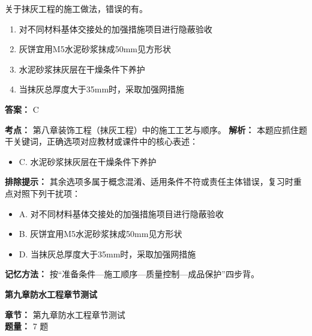\documentclass[UTF8,fontset=fandol,11pt]{ctexart}
\newcommand{\chaptertitle}[1]{\vspace{0.5em}\begin{tcolorbox}[enhanced,colback=deepblue,colframe=deepblue,arc=2mm,boxrule=0pt]\begin{center}\Large\bfseries\color{white}#1\end{center}\end{tcolorbox}\vspace{0.5em}}
\begin{document}
\begin{quizbox}[title={第 2 题}]
关于抹灰工程的施工做法，错误的有。\\
\begin{enumerate}[label=\Alph*.]
\item 对不同材料基体交接处的加强措施项目进行隐蔽验收
\item 灰饼宜用M5水泥砂浆抹成50mm见方形状
\item 水泥砂浆抹灰层在干燥条件下养护
\item 当抹灰总厚度大于35mm时，采取加强网措施
\end{enumerate}
\textbf{答案：} C
\vspace{0.25em}
\begin{answerbox}[title={考点解析}]
\textbf{考点：} 第八章装饰工程（抹灰工程）中的施工工艺与顺序。
\textbf{解析：} 本题应抓住题干关键词，正确选项对应教材或课件中的核心表述：
\begin{itemize}
\item C. 水泥砂浆抹灰层在干燥条件下养护
\end{itemize}
\textbf{排除提示：} 其余选项多属于概念混淆、适用条件不符或责任主体错误，复习时重点对照下列干扰项：
\begin{itemize}
\item A. 对不同材料基体交接处的加强措施项目进行隐蔽验收
\item B. 灰饼宜用M5水泥砂浆抹成50mm见方形状
\item D. 当抹灰总厚度大于35mm时，采取加强网措施
\end{itemize}
\textbf{记忆方法：} 按“准备条件—施工顺序—质量控制—成品保护”四步背。
\end{answerbox}
\end{quizbox}

\chaptertitle{第九章防水工程章节测试}
\begin{mainbox}
\textbf{\textcolor{mainblue}{章节：}} 第九章防水工程章节测试\\
\textbf{\textcolor{answerred}{题量：}} 7 题
\end{mainbox}
\end{document}
